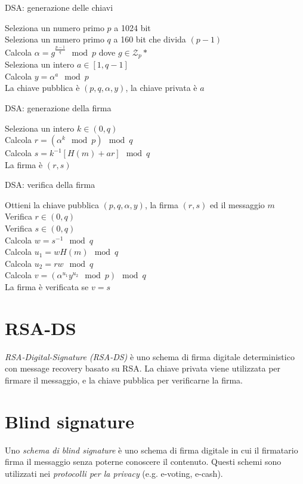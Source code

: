 \bigskip
\begin{algorithm}[H]
  \caption{DSA: generazione delle chiavi}
  \label{alg:dsa-key-generation}
  \SetAlgoNoLine
  Seleziona un numero primo $p$ a 1024 bit\\
  Seleziona un numero primo $q$ a 160 bit che divida $(p-1)$\\
  Calcola $\alpha=g^{\frac{p-1}{q}} \mod p$ dove $g \in \mathcal{Z}_{p}*$\\
  Seleziona un intero $a \in [1,q-1]$\\
  Calcola $y=\alpha^{a} \mod p$\\
  La chiave pubblica è $(p,q,\alpha,y)$, la chiave privata è $a$
\end{algorithm}

\bigskip
\begin{algorithm}[H]
  \caption{DSA: generazione della firma}
  \label{alg:dsa-signature}
  \SetAlgoNoLine
  Seleziona un intero $k \in (0,q)$\\
  Calcola $r=(\alpha ^{k} \mod p) \mod q$\\
  Calcola $s=k^{-1}[H(m)+ar] \mod q$\\
  La firma è $(r,s)$
\end{algorithm}

\bigskip
\begin{algorithm}[H]
  \caption{DSA: verifica della firma}
  \label{alg:dsa-verification}
  \SetAlgoNoLine
  Ottieni la chiave pubblica $(p,q,\alpha,y)$, la firma $(r,s)$ ed il messaggio $m$\\
  Verifica $r\in (0,q)$\\
  Verifica $s\in (0,q)$\\
  Calcola $w=s^{-1} \mod q$\\
  Calcola $u_{1}=wH(m)\mod q$\\
  Calcola $u_{2}=rw\mod q$\\
  Calcola $v=(\alpha^{u_{1}}y^{u_{2}} \mod p) \mod q$\\
  La firma è verificata se $v=s$
\end{algorithm}


\section{RSA-DS}
\textit{RSA-Digital-Signature (RSA-DS)} è uno schema di firma digitale deterministico con message recovery basato su RSA.
La chiave privata viene utilizzata per firmare il messaggio, e la chiave pubblica per verificarne la firma.


\section{Blind signature}
Uno \textit{schema di blind signature} è uno schema di firma digitale in cui il firmatario firma il messaggio senza poterne conoscere il contenuto.
Questi schemi sono utilizzati nei \textit{protocolli per la privacy} (e.g. e-voting, e-cash).

